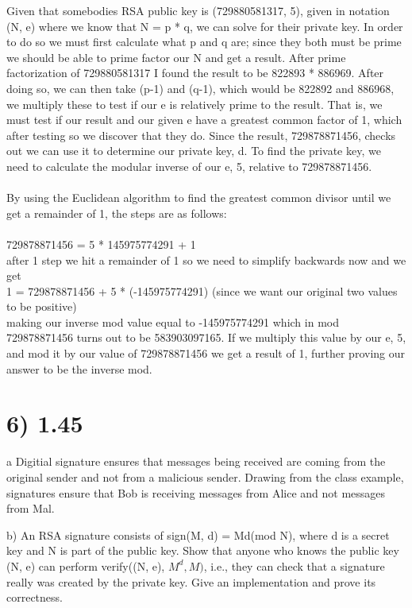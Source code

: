 \documentclass[a4paper]{article}
\begin{document}
Given that somebodies RSA public key is (729880581317, 5), given in notation (N, e) where we know that N = p * q, we can solve for their private key. In order to do so we must first calculate what p and q are; since they both must be prime we should be able to prime factor our N and get a result. After prime factorization of 729880581317 I found the result to be 822893 * 886969. After doing so, we can then take (p-1) and (q-1), which would be 822892 and 886968, we multiply these to test if our e is relatively prime to the result. That is, we must test if our result and our given e have a greatest common factor of 1, which after testing so we discover that they do. Since the result, 729878871456, checks out we can use it to determine our private key, d. To find the private key, we need to calculate the modular inverse of our e, 5, relative to 729878871456. 
\\
\\
By using the Euclidean algorithm to find the greatest common divisor until we get a remainder of 1, the steps are as follows: 
\\
\\
729878871456 = 5 * 145975774291 + 1
\\
after 1 step we hit a remainder of 1 so we need to simplify backwards now and we get
\\
1 = 729878871456 + 5 * (-145975774291)     (since we want our original two values to be positive)
\\
making our inverse mod value equal to -145975774291 which in mod 729878871456 turns out to be 583903097165. If we multiply this value by our e, 5, and mod it by our value of 729878871456 we get a result of 1, further proving our answer to be the inverse mod. 
\\

\section*{6) 1.45}
a Digitial signature ensures that messages being received are coming from the original sender and not from a malicious sender. Drawing from the class example, signatures ensure that Bob is receiving messages from Alice and not messages from Mal.

b) An RSA signature consists of sign(M, d) = Md(mod N), where d is a secret key and N is part of the public key. Show that anyone who knows the public key (N, e) can perform verify((N, e), $M^{d}, M)$, i.e., they can check that a signature really was created by the private key. Give an implementation and prove its correctness.
\end{document}
